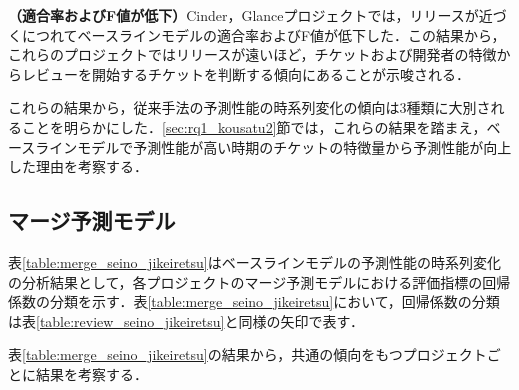 \documentclass[submit]{ipsj}
\begin{document}
\textbf{（適合率およびF値が低下）}Cinder，Glanceプロジェクトでは，リリースが近づくにつれてベースラインモデルの適合率およびF値が低下した．この結果から，これらのプロジェクトではリリースが遠いほど，チケットおよび開発者の特徴からレビューを開始するチケットを判断する傾向にあることが示唆される．

これらの結果から，従来手法の予測性能の時系列変化の傾向は3種類に大別されることを明らかにした．\ref{sec:rq1_kousatu2}節では，これらの結果を踏まえ，ベースラインモデルで予測性能が高い時期のチケットの特徴量から予測性能が向上した理由を考察する．


\begin{table}[t]
\caption{各プロジェクトのレビュー予測モデルにおける評価指標の回帰係数の分類}
\label{table:review_seino_jikeiretsu}
\centering
\vspace{0.5zh}
\end{table}



\subsection{マージ予測モデル}
表\ref{table:merge_seino_jikeiretsu}はベースラインモデルの予測性能の時系列変化の分析結果として，各プロジェクトのマージ予測モデルにおける評価指標の回帰係数の分類を示す．表\ref{table:merge_seino_jikeiretsu}において，回帰係数の分類は表\ref{table:review_seino_jikeiretsu}と同様の矢印で表す．

表\ref{table:merge_seino_jikeiretsu}の結果から，共通の傾向をもつプロジェクトごとに結果を考察する．
\end{document}

